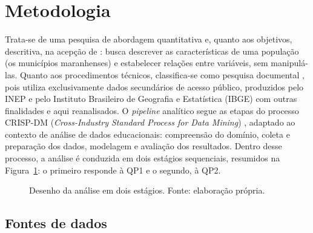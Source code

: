 \section{Metodologia}
\label{sec:metodos}

Trata-se de uma pesquisa de abordagem quantitativa e, quanto aos objetivos, descritiva, na acepção de \citet{gil2017}: busca descrever as características de uma população (os municípios maranhenses) e estabelecer relações entre variáveis, sem manipulá-las. Quanto aos procedimentos técnicos, classifica-se como pesquisa documental \citep{gil2017}, pois utiliza exclusivamente dados secundários de acesso público, produzidos pelo INEP e pelo Instituto Brasileiro de Geografia e Estatística (IBGE) com outras finalidades e aqui reanalisados. O \textit{pipeline} analítico segue as etapas do processo CRISP-DM (\textit{Cross-Industry Standard Process for Data Mining}) \citep{shearer2000}, adaptado ao contexto de análise de dados educacionais: compreensão do domínio, coleta e preparação dos dados, modelagem e avaliação dos resultados. Dentro desse processo, a análise é conduzida em dois estágios sequenciais, resumidos na Figura~\ref{fig:fluxo}: o primeiro responde à QP1 e o segundo, à QP2.

\begin{figure}[!ht]
    \centering
    \small
    \caption{Desenho da análise em dois estágios. Fonte: elaboração própria.}
    \label{fig:fluxo}
\end{figure}

\subsection{Fontes de dados}

